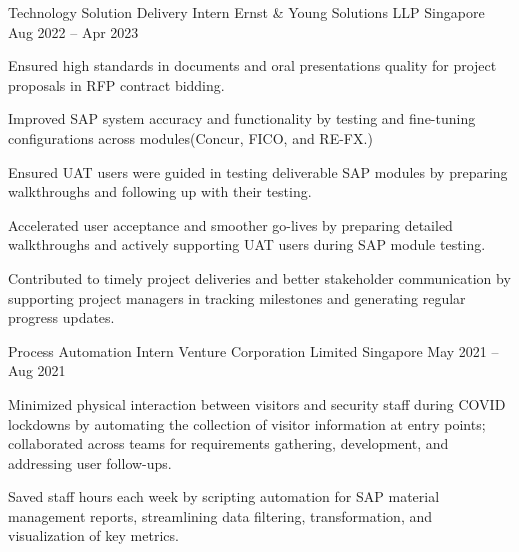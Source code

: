 

\begin{cventries}

  \cventry
  {Technology Solution Delivery Intern} %
  {Ernst \& Young Solutions LLP} %
  {Singapore} %
  {Aug 2022 – Apr 2023} %
  {
    \begin{cvitems} %
      \item {Ensured high standards in documents and oral presentations quality for project proposals in RFP contract bidding.}
      \item {Improved SAP system accuracy and functionality by testing and fine-tuning configurations across modules(Concur, FICO, and RE-FX.)}
      \item {Ensured UAT users were guided in testing deliverable SAP modules by preparing walkthroughs and following up with their testing.}
      \item {Accelerated user acceptance and smoother go-lives by preparing detailed walkthroughs and actively supporting UAT users during SAP module testing.}
      \item {Contributed to timely project deliveries and better stakeholder communication by supporting project managers in tracking milestones and generating regular progress updates.}
      \vspace{3mm}
    \end{cvitems}
  }

  \cventry
  {Process Automation Intern} %
  {Venture Corporation Limited} %
  {Singapore} %
  {May 2021 – Aug 2021} %
  {
    \begin{cvitems} %
      \item {Minimized physical interaction between visitors and security staff during COVID lockdowns by automating the collection of visitor information at entry points; collaborated across teams for requirements gathering, development, and addressing user follow-ups.}
      \item {Saved staff hours each week by scripting automation for SAP material management reports, streamlining data filtering, transformation, and visualization of key metrics.}
      \vspace{3mm}
    \end{cvitems}
  }


\end{cventries}
